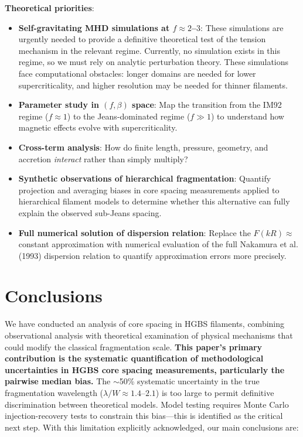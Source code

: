 \documentclass[11pt,a4paper]{article}
\begin{document}
\textbf{Theoretical priorities}:
\begin{itemize}
    \item \textbf{Self-gravitating MHD simulations at $f \approx 2$--$3$}: These simulations are urgently needed to provide a definitive theoretical test of the tension mechanism in the relevant regime. Currently, no simulation exists in this regime, so we must rely on analytic perturbation theory. These simulations face computational obstacles: longer domains are needed for lower supercriticality, and higher resolution may be needed for thinner filaments.
    \item \textbf{Parameter study in $(f, \beta)$ space}: Map the transition from the IM92 regime ($f \approx 1$) to the Jeans-dominated regime ($f \gg 1$) to understand how magnetic effects evolve with supercriticality.
    \item \textbf{Cross-term analysis}: How do finite length, pressure, geometry, and accretion \textit{interact} rather than simply multiply?
    \item \textbf{Synthetic observations of hierarchical fragmentation}: Quantify projection and averaging biases in core spacing measurements applied to hierarchical filament models to determine whether this alternative can fully explain the observed sub-Jeans spacing.
    \item \textbf{Full numerical solution of dispersion relation}: Replace the $F(kR) \approx$ constant approximation with numerical evaluation of the full Nakamura et al. (1993) dispersion relation to quantify approximation errors more precisely.
\end{itemize}

\section{Conclusions}
\label{sec:conclusions}

We have conducted an analysis of core spacing in HGBS filaments, combining observational analysis with theoretical examination of physical mechanisms that could modify the classical fragmentation scale. \textbf{This paper's primary contribution is the systematic quantification of methodological uncertainties in HGBS core spacing measurements, particularly the pairwise median bias.} The $\sim$50\% systematic uncertainty in the true fragmentation wavelength ($\lambda/W \approx 1.4$--$2.1$) is too large to permit definitive discrimination between theoretical models. Model testing requires Monte Carlo injection-recovery tests to constrain this bias—this is identified as the critical next step. With this limitation explicitly acknowledged, our main conclusions are:
\end{document}
